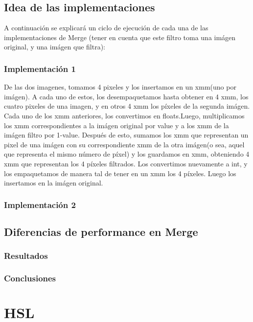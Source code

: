 \documentclass[a4paper]{article}
\begin{document}
\subsection{Idea de las implementaciones}
A continuación se explicará un ciclo de ejecución de cada una de las implementaciones de Merge (tener en cuenta que este filtro toma una imágen original, y una imágen que filtra):
\subsubsection{Implementación 1}
De las dos imagenes, tomamos 4 pixeles y los insertamos en un xmm(uno por imágen). A cada uno de estos, los desempaquetamos hasta obtener en 4 xmm, los cuatro pixeles de una imagen, y en otros 4 xmm los píxeles de la segunda imágen. Cada uno de los xmm anteriores, los convertimos en floats.Luego, multiplicamos los xmm correspondientes a la imágen original por value y a los xmm de la imágen filtro por 1-value. Después de esto, sumamos los xmm que representan un pixel de una imágen con su correspondiente xmm de la otra imágen(o sea, aquel que representa el mismo número de píxel) y los guardamos en xmm, obteniendo 4 xmm que representan los 4 píxeles filtrados. Los convertimos nuevamente a int, y los empaquetamos de manera tal de tener en un xmm los 4 píxeles. Luego los insertamos en la imágen original.
\subsubsection{Implementación 2}



\subsection{Diferencias de performance en Merge}


\subsubsection{Resultados}

\subsubsection{Conclusiones}


\newpage

\section{HSL}
\end{document}
